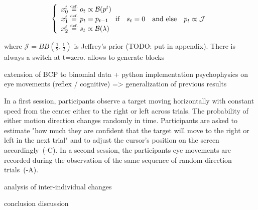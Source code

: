 \documentclass[profile,final,english, draft]{article}%
\newcommand{\choice}[1]{ %
	\left\{ %
		\begin{array}{l} #1 \end{array} %
	\right. }
\newcommand{\eqdef}{\ensuremath{\stackrel{\mbox{\upshape\tiny def.}}{=}}}
\newcommand{\eql}[1]{\begin{equation}#1\end{equation}}
\newcommand{\Bb}{\mathcal{B}}
\newcommand{\Jj}{\mathcal{J}}
\begin{document}
\eql{\choice{
x_0^t \eqdef o_t \propto \Bb(p^t) \\
x_1^t \eqdef p_t = p_{t-1} \quad \text{if} \quad s_t=0 \quad \text{and else} \quad p_t \propto \Jj \\
x_2^t \eqdef s_t \propto \Bb(\lambda)
}}

where $\Jj = BB(\frac 1 2 , \frac 1 2 )$ is Jeffrey's prior (TODO: put in appendix). There is always a switch at t=zero.
allows to generate blocks




extension of BCP to binomial data + python implementation
psychophysics on eye movements (reflex / cognitive) => generalization of previous results


In a first session, participants observe a target moving horizontally
with constant speed from the center
either to the right or left across trials.
The probability of either motion direction changes randomly in time.
Participants are asked to estimate
"how much they are confident that
the target will move to the right or left in the next trial" and
to adjust the cursor's position on the screen accordingly~(-C).
In a second session, the participants eye movements are recorded during
the observation of the same sequence of random-direction trials~(-A). %

analysis of inter-individual changes

conclusion discussion
\end{document}
